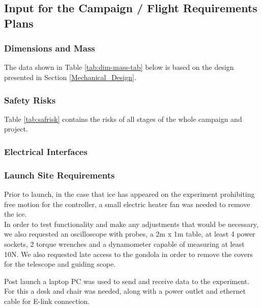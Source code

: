 \subsection{Input for the Campaign / Flight Requirements Plans}


\subsubsection{Dimensions and Mass}
\label{sec:dim-mass}

The data shown in Table \ref{tab:dim-mass-tab} below is based on the design presented in Section \ref{Mechanical_Design}. %



\subsubsection{Safety Risks}
Table \ref{tab:safrisk} contains the risks of all stages of the whole campaign and project.


\subsubsection{Electrical Interfaces}




\subsubsection{Launch Site Requirements}
Prior to launch, in the case that ice has appeared on the experiment prohibiting free motion for the controller, a small electric heater fan was needed to remove the ice. \\

In order to test functionality and make any adjustments that would be necessary, we also requested an oscilloscope with probes, a 2m x 1m table, at least 4 power sockets, 2 torque wrenches and a dynamometer capable of measuring at least 10N. We also requested late access to the gondola in order to remove the covers for the telescope and guiding scope.

Post launch a laptop PC was used to send and receive data to the experiment. For this a desk and chair was needed, along with a power outlet and ethernet cable for E-link connection.


